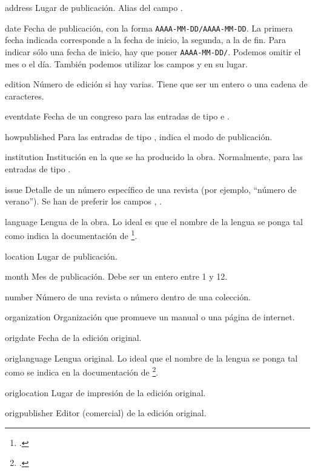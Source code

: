 \begin{choix}
	\item[address]
	Lugar de publicación. Alias del campo .	
	\item[date] 
	Fecha de publicación, con la forma \verb|AAAA-MM-DD/AAAA-MM-DD|.
	La primera fecha indicada corresponde a la fecha de inicio, la
        segunda, a la de fin. Para indicar sólo una fecha de inicio,
        hay que poner \verb|AAAA-MM-DD/|. 
	Podemos omitir el mes o el día. También podemos utilizar los
        campos  y  en su lugar. 
   	\item[edition]
	Número de edición si hay varias. Tiene que ser un entero o una
        cadena de caracteres.
      \item[eventdate] Fecha de un congreso para las entradas de tipo
         e .
	\item[howpublished] Para las entradas de tipo ,
          indica el modo de publicación.
   	\item[institution] Institución en la que se ha producido la
          obra. Normalmente, para las entradas de tipo . 
   	\item[issue] Detalle de un número específico de una revista
          (por ejemplo, \enquote{número de verano}). Se han de
          preferir los campos , .	
   	\item[language] Lengua de la obra. Lo ideal es que el nombre
          de la lengua se ponga tal como indica la documentación de
          \footcite{polyglossia}.
   	\item[location] Lugar de publicación.  					
   	\item[month] Mes de publicación. Debe ser un entero entre 1 y 12. 
   	\item[number] Número de una revista o número dentro de una colección. 	
   	\item[organization] Organización que promueve un manual o una
          página de internet.	
   	\item[origdate] Fecha de la edición original.						
   	\item[origlanguage] Lengua original. Lo ideal que el nombre de
          la lengua se ponga tal como se indica en la documentación de
          \footcite{polyglossia}.
   	\item[origlocation] Lugar de impresión de la edición original.		
   	\item[origpublisher] Editor (comercial) de la edición original.		

\end{choix}
